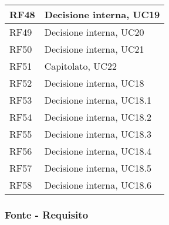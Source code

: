 \begin{center}
\begin{longtable}{|C{5cm}|C{5cm}|}
        \hline
        RF48 & Decisione interna, UC19 \\
        \hline
        RF49 & Decisione interna, UC20 \\
        \hline
        RF50 & Decisione interna, UC21 \\
        \hline
        RF51 & Capitolato, UC22 \\
        \hline
        RF52 & Decisione interna, UC18 \\
        \hline
        RF53 & Decisione interna, UC18.1 \\
        \hline
        RF54 & Decisione interna, UC18.2 \\
        \hline
        RF55 & Decisione interna, UC18.3 \\
        \hline
        RF56 & Decisione interna, UC18.4 \\
        \hline
        RF57 & Decisione interna, UC18.5 \\
        \hline
        RF58 & Decisione interna, UC18.6 \\
        \hline
    \end{longtable}
\end{center}


  \subsubsection{Fonte - Requisito}

